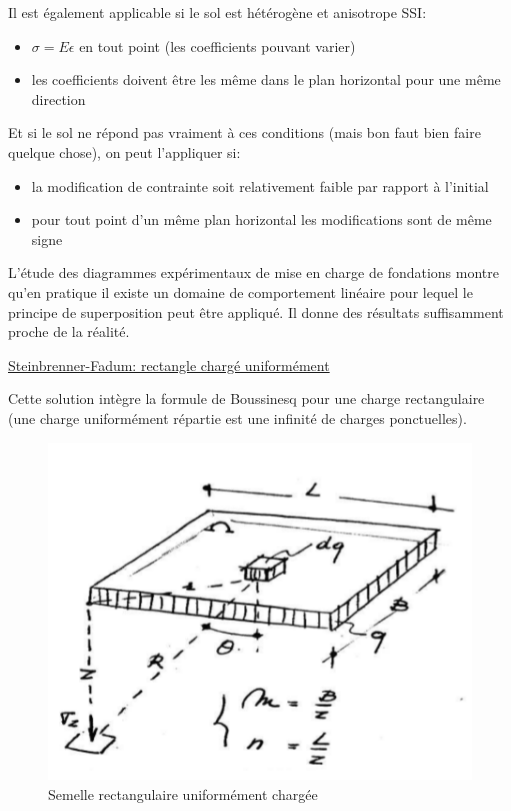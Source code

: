             Il est également applicable si le sol est hétérogène et anisotrope SSI:
            \begin{itemize}
                \item $\sigma = E \epsilon$ en tout point (les coefficients pouvant varier)
                \item les coefficients doivent être les même dans le plan horizontal pour une même direction
            \end{itemize} 
            Et si le sol ne répond pas vraiment à ces conditions (mais bon faut bien faire quelque chose), on peut l'appliquer si:
            \begin{itemize}
                \item la modification de contrainte soit relativement faible par rapport à l'initial
                \item pour tout point d'un même plan horizontal les modifications sont de même signe
            \end{itemize}
            L'étude des diagrammes expérimentaux de mise en charge de fondations montre qu'en pratique il existe un domaine de comportement linéaire pour lequel le principe de superposition peut être appliqué. Il donne des résultats suffisamment proche de la réalité.
        
            
                \underline{Steinbrenner-Fadum: rectangle chargé uniformément}
            
                Cette solution intègre la formule de Boussinesq pour une charge rectangulaire (une charge uniformément répartie est une infinité de charges ponctuelles).
            
                \begin{figure}[h!]
                    \centering
                    \includegraphics[scale=0.8]{Holeyman/images/H28.PNG}
                    \caption{Semelle rectangulaire uniformément chargée}
                \end{figure}
            
